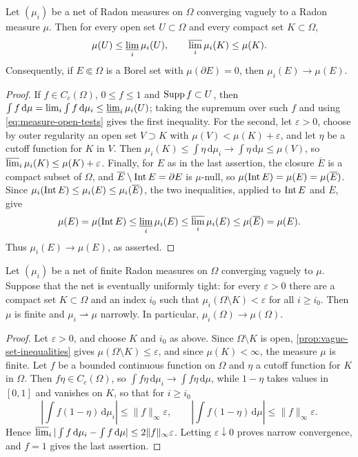 \begin{proposition}\label{prop:vague-set-inequalities}
Let $(\mu_i)$ be a net of Radon measures on $\Omega$ converging vaguely to a Radon measure $\mu$. Then for every open set $U\subset\Omega$ and every compact set $K\subset\Omega$,
\[
 \mu(U)\leq\varliminf_i\mu_i(U),\qquad
 \varlimsup_i\mu_i(K)\leq\mu(K).
\]
Consequently, if $E\Subset\Omega$ is a Borel set with $\mu(\partial E)=0$, then $\mu_i(E)\to\mu(E)$.
\end{proposition}
\begin{proof}
If $f\in C_c(\Omega)$, $0\leq f\leq1$ and $\operatorname{Supp} f\subset U$, then $\int f\,\mathrm d\mu=\lim_i\int f\,\mathrm d\mu_i\leq\varliminf_i\mu_i(U)$; taking the supremum over such $f$ and using \eqref{eq:measure-open-tests} gives the first inequality. For the second, let $\varepsilon>0$, choose by outer regularity an open set $V\supset K$ with $\mu(V)<\mu(K)+\varepsilon$, and let $\eta$ be a cutoff function for $K$ in $V$. Then $\mu_i(K)\leq\int\eta\,\mathrm d\mu_i\to\int\eta\,\mathrm d\mu\leq\mu(V)$, so $\varlimsup_i\mu_i(K)\leq\mu(K)+\varepsilon$. Finally, for $E$ as in the last assertion, the closure $\overline E$ is a compact subset of $\Omega$, and $\overline E\setminus\operatorname{Int} E=\partial E$ is $\mu$-null, so $\mu(\operatorname{Int} E)=\mu(E)=\mu(\overline E)$. Since $\mu_i(\operatorname{Int} E)\leq\mu_i(E)\leq\mu_i(\overline E)$, the two inequalities, applied to $\operatorname{Int} E$ and $\overline E$, give
\[
 \mu(E)=\mu(\operatorname{Int} E)\leq\varliminf_i\mu_i(E)\leq\varlimsup_i\mu_i(E)\leq\mu(\overline E)=\mu(E).
\]
Thus $\mu_i(E)\to\mu(E)$, as asserted.
\end{proof}

\begin{proposition}\label{prop:tight-vague-narrow}
Let $(\mu_i)$ be a net of finite Radon measures on $\Omega$ converging vaguely to $\mu$. Suppose that the net is eventually uniformly tight: for every $\varepsilon>0$ there are a compact set $K\subset\Omega$ and an index $i_0$ such that $\mu_i(\Omega\setminus K)<\varepsilon$ for all $i\geq i_0$. Then $\mu$ is finite and $\mu_i\rightharpoonup\mu$ narrowly. In particular, $\mu_i(\Omega)\to\mu(\Omega)$.
\end{proposition}
\begin{proof}
Let $\varepsilon>0$, and choose $K$ and $i_0$ as above. Since $\Omega\setminus K$ is open, \cref{prop:vague-set-inequalities} gives $\mu(\Omega\setminus K)\leq\varepsilon$, and since $\mu(K)<\infty$, the measure $\mu$ is finite. Let $f$ be a bounded continuous function on $\Omega$ and $\eta$ a cutoff function for $K$ in $\Omega$. Then $f\eta\in C_c(\Omega)$, so $\int f\eta\,\mathrm d\mu_i\to\int f\eta\,\mathrm d\mu$, while $1-\eta$ takes values in $[0,1]$ and vanishes on $K$, so that for $i\geq i_0$
\[
 \left|\int f(1-\eta)\,\mathrm d\mu_i\right|\leq\|f\|_\infty\varepsilon,
 \qquad
 \left|\int f(1-\eta)\,\mathrm d\mu\right|\leq\|f\|_\infty\varepsilon.
\]
Hence $\varlimsup_i|\int f\,\mathrm d\mu_i-\int f\,\mathrm d\mu|\leq2\|f\|_\infty\varepsilon$. Letting $\varepsilon\downarrow0$ proves narrow convergence, and $f=1$ gives the last assertion.
\end{proof}

